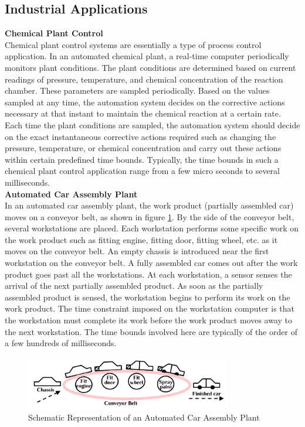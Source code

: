 \documentclass[12pt]{report}
\begin{document}
\subsection{Industrial Applications}
\noindent \textbf{Chemical Plant Control}\\
Chemical plant control systems are essentially a type of process control application. In an automated chemical plant, a real-time computer periodically monitors plant conditions. The plant conditions are determined based on current readings of pressure, temperature, and chemical concentration of the reaction chamber. These parameters are sampled periodically. Based on the values sampled at any time, the automation system decides on the corrective actions necessary at that instant to maintain the chemical reaction at a certain rate. Each time the plant conditions are sampled, the automation system should decide on the exact instantaneous corrective actions required such as changing the pressure, temperature, or chemical concentration and carry out these actions within certain predefined time bounds. Typically, the time bounds in such a chemical plant control application range from a few micro seconds to several milliseconds.\\

\noindent\textbf{Automated Car Assembly Plant}\\
In an automated car assembly plant, the work product (partially assembled car) moves on a conveyor belt, as shown in figure \ref{fig:car}. By the side of the conveyor belt, several workstations are placed. Each workstation performs some specific work on the work product such as fitting engine, fitting door, fitting wheel, etc. as it moves on the conveyor belt. An empty chassis is introduced near the first workstation on the conveyor belt. A fully assembled car comes out after the work product goes past all the workstations. At each workstation, a sensor senses the arrival of the next partially assembled product. As soon as the partially assembled product is sensed, the workstation begins to perform its work on the work product. The time constraint imposed on the workstation computer is that the workstation must complete its work before the work product moves away to the next workstation. The time bounds involved here are typically of the order of a few hundreds of milliseconds. 
\begin{figure}[h]
    \centering
    \includegraphics[width=0.8\textwidth]{images/car-assembly.png}
    \caption{Schematic Representation of an Automated Car Assembly Plant }
    \label{fig:car}
\end{figure}
\end{document}
